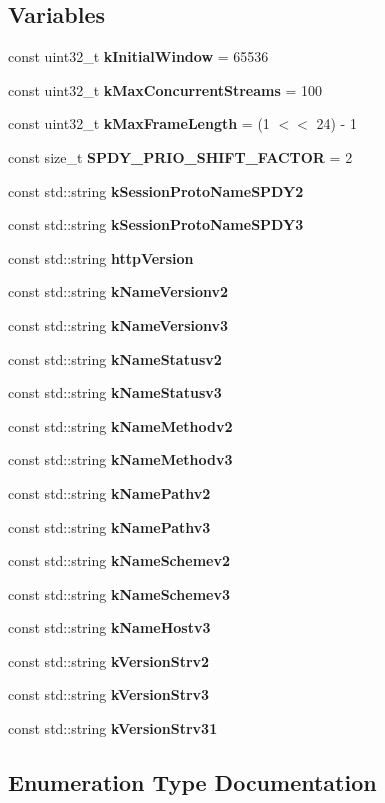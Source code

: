 \subsection*{Variables}
\begin{DoxyCompactItemize}
\item 
const uint32\+\_\+t {\bf k\+Initial\+Window} = 65536
\item 
const uint32\+\_\+t {\bf k\+Max\+Concurrent\+Streams} = 100
\item 
const uint32\+\_\+t {\bf k\+Max\+Frame\+Length} = (1 $<$$<$ 24) -\/ 1
\item 
const size\+\_\+t {\bf S\+P\+D\+Y\+\_\+\+P\+R\+I\+O\+\_\+\+S\+H\+I\+F\+T\+\_\+\+F\+A\+C\+T\+OR} = 2
\item 
const std\+::string {\bf k\+Session\+Proto\+Name\+S\+P\+D\+Y2}
\item 
const std\+::string {\bf k\+Session\+Proto\+Name\+S\+P\+D\+Y3}
\item 
const std\+::string {\bf http\+Version}
\item 
const std\+::string {\bf k\+Name\+Versionv2}
\item 
const std\+::string {\bf k\+Name\+Versionv3}
\item 
const std\+::string {\bf k\+Name\+Statusv2}
\item 
const std\+::string {\bf k\+Name\+Statusv3}
\item 
const std\+::string {\bf k\+Name\+Methodv2}
\item 
const std\+::string {\bf k\+Name\+Methodv3}
\item 
const std\+::string {\bf k\+Name\+Pathv2}
\item 
const std\+::string {\bf k\+Name\+Pathv3}
\item 
const std\+::string {\bf k\+Name\+Schemev2}
\item 
const std\+::string {\bf k\+Name\+Schemev3}
\item 
const std\+::string {\bf k\+Name\+Hostv3}
\item 
const std\+::string {\bf k\+Version\+Strv2}
\item 
const std\+::string {\bf k\+Version\+Strv3}
\item 
const std\+::string {\bf k\+Version\+Strv31}
\end{DoxyCompactItemize}


\subsection{Enumeration Type Documentation}
